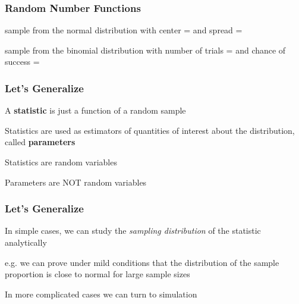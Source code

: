 \documentclass[12pt]{beamer}\usepackage[]{graphicx}\usepackage[]{color}
\begin{document}

\begin{frame}
\frametitle{Random Number Functions}

{\hilit {}} sample from the normal distribution with center =  and spread = 

\pause
\bigskip
{\hilit {}} sample from the binomial distribution with number of trials =  and chance of success = 

\end{frame}


\begin{frame}
\begin{center}
\Huge{}
\end{center}
\end{frame}


\begin{frame}
\frametitle{Let's Generalize}

\bbi
  \item A \textbf{statistic} is just a function of a random sample
  \item Statistics are used as estimators of quantities of interest about the distribution, called \textbf{parameters}
  \item Statistics are random variables
  \item Parameters are NOT random variables
\ei

\end{frame}


\begin{frame}
\frametitle{Let's Generalize}

\bbi
  \item In simple cases, we can study the \textit{sampling distribution} of the statistic analytically
  \item e.g. we can prove under mild conditions that the distribution of the sample proportion is close to normal for large sample sizes
  \item In more complicated cases we can turn to simulation
\ei

\end{frame}
\end{document}
